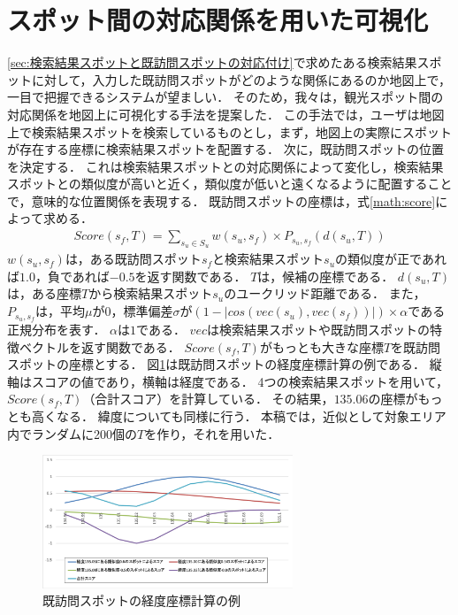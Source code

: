 \documentclass{deimj}
\begin{document}
\section{スポット間の対応関係を用いた可視化}
\label{sec:検索結果スポットと既訪問スポットの対応関係を用いた可視化}
\ref{sec:検索結果スポットと既訪問スポットの対応付け}で求めたある検索結果スポットに対して，入力した既訪問スポットがどのような関係にあるのか地図上で，一目で把握できるシステムが望ましい．
そのため，我々は，観光スポット間の対応関係を地図上に可視化する手法\cite{潘STI}を提案した．
この手法では，ユーザは地図上で検索結果スポットを検索しているものとし，まず，地図上の実際にスポットが存在する座標に検索結果スポットを配置する．
次に，既訪問スポットの位置を決定する．
これは検索結果スポットとの対応関係によって変化し，検索結果スポットとの類似度が高いと近く，類似度が低いと遠くなるように配置することで，意味的な位置関係を表現する．
既訪問スポットの座標は，式\ref{math:score}によって求める．
\begin{eqnarray}
Score(s_f,T) = \sum_{s_u \in S_u}^{} w(s_u,s_f) \times P_{s_u,s_f}(d(s_u,T))
    \label{math:score}
\end{eqnarray}
$w(s_u,s_f)$は，ある既訪問スポット$s_f$と検索結果スポット$s_u$の類似度が正であれば$1.0$，負であれば$-0.5$を返す関数である．
$T$は，候補の座標である．
$d(s_u,T)$は，ある座標$T$から検索結果スポット$s_u$のユークリッド距離である．
また，$P_{s_u,s_f}$は，平均$\mu$が$0$，標準偏差$\sigma$が$(1-|cos(vec(s_u),vec(s_f))|) \times \alpha$である正規分布を表す．
$\alpha$は$1$である．
$vec$は検索結果スポットや既訪問スポットの特徴ベクトルを返す関数である．
$Score(s_f,T)$がもっとも大きな座標$T$を既訪問スポットの座標とする．
図\ref{fig:image}は既訪問スポットの経度座標計算の例である．
縦軸はスコアの値であり，横軸は経度である．
4つの検索結果スポットを用いて，$Score(s_f,T)$（合計スコア）を計算している．
その結果，$135.06$の座標がもっとも高くなる．
緯度についても同様に行う．
本稿では，近似として対象エリア内でランダムに200個の$T$を作り，それを用いた．
\begin{figure}[t]
  \begin{center}
    \includegraphics[clip,width=7.5cm]{picture/score_image2.png}
    \caption{既訪問スポットの経度座標計算の例}
    \label{fig:image}
  \end{center}
\end{figure}
\end{document}

